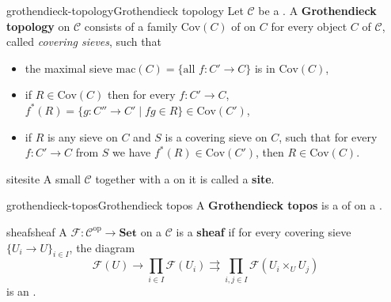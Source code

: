 \begin{topic}{grothendieck-topology}{Grothendieck topology}
    Let $\mathcal{C}$ be a . A \textbf{Grothendieck topology} on $\mathcal{C}$ consists of a family $\text{Cov}(C)$ of  on $C$ for every object $C$ of $\mathcal{C}$, called \textit{covering sieves}, such that
    \begin{itemize}
        \item the maximal sieve $\text{mac}(C) = \{ \text{all } f : C' \to C \}$ is in $\text{Cov}(C)$,
        \item if $R \in \text{Cov}(C)$ then for every $f : C' \to C$, $f^*(R) = \{ g : C'' \to C' \;|\; fg \in R \} \in \text{Cov}(C')$,
        \item if $R$ is any sieve on $C$ and $S$ is a covering sieve on $C$, such that for every $f : C' \to C$ from $S$ we have $f^*(R) \in \text{Cov}(C')$, then $R \in \text{Cov}(C)$.
    \end{itemize}
\end{topic}

\begin{topic}{site}{site}
    A small  $\mathcal{C}$ together with a  on it is called a \textbf{site}.
\end{topic}

\begin{topic}{grothendieck-topos}{Grothendieck topos}
    A \textbf{Grothendieck topos} is a  of  on a .
\end{topic}

\begin{topic}{sheaf}{sheaf}
    A  $\mathcal{F} : \mathcal{C}^\text{op} \to \textbf{Set}$ on a  $\mathcal{C}$ is a \textbf{sheaf} if for every covering sieve $\{ U_i \to U \}_{i \in I}$, the diagram
    \[ \mathcal{F}(U) \to \prod_{i \in I} \mathcal{F}(U_i) \rightrightarrows \prod_{i, j \in I} \mathcal{F}(U_i \times_U U_j) \]
    is an .
\end{topic}

